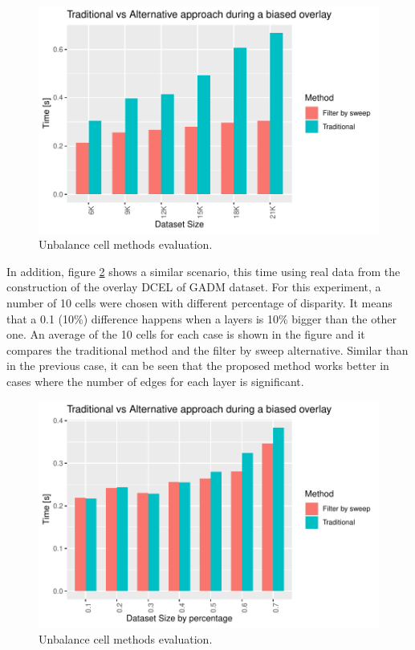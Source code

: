 \begin{figure}
    \centering
    \includegraphics[width=\linewidth]{figures/experiments/Unbalance_Tester/Unbalance_Tester01.pdf}
    \caption{Unbalance cell methods evaluation.}\label{fig:unbalance_tester1}
\end{figure}

In addition, figure \ref{fig:unbalance_tester2} shows a similar scenario, this time using real data from the construction of the overlay DCEL of GADM dataset. For this experiment, a number of 10 cells were chosen with different percentage of disparity. It means that a 0.1 (10\%) difference happens when a layers is 10\% bigger than the other one. An average of the 10 cells for each case is shown in the figure and it compares the traditional method and the filter by sweep alternative.  Similar than in the previous case, it can be seen that the proposed method works better in cases where the number of edges for each layer is significant.

\begin{figure}
    \centering
    \includegraphics[width=\linewidth]{figures/experiments/Unbalance_Tester/Unbalance_Tester02.pdf}
    \caption{Unbalance cell methods evaluation.}\label{fig:unbalance_tester2}
\end{figure}